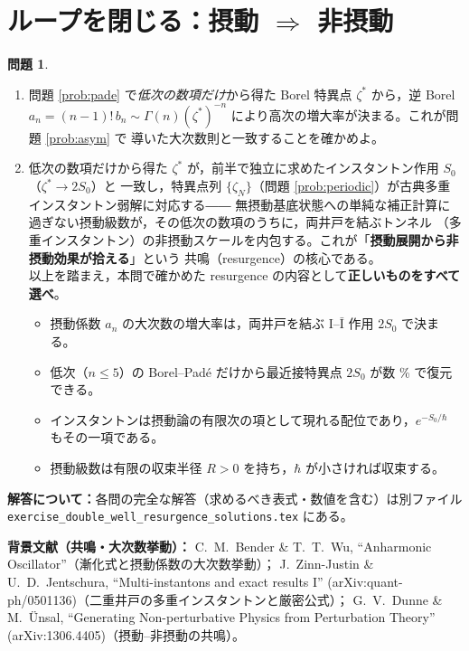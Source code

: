 \documentclass[dvipdfmx, uplatex]{jsarticle}
\newcommand{\hb}{\hbar}
\theoremstyle{definition}
\newtheorem{prob}{問題}
\begin{document}
\section{ループを閉じる：摂動 $\Rightarrow$ 非摂動}

\begin{prob}\label{prob:loop}
\begin{enumerate}
\item 問題 \ref{prob:pade} で\emph{低次の数項だけ}から得た Borel 特異点 $\zeta^\ast$ から，逆 Borel
$a_n=(n-1)!\,b_n\sim\Gamma(n)(\zeta^\ast)^{-n}$ により高次の増大率が決まる。これが問題 \ref{prob:asym} で
導いた大次数則と一致することを確かめよ。
\item 低次の数項だけから得た $\zeta^\ast$ が，前半で独立に求めたインスタントン作用 $S_0$（$\zeta^\ast\to2S_0$）と
一致し，特異点列 $\{\zeta_N\}$（問題 \ref{prob:periodic}）が古典多重インスタントン弱解に対応する――
無摂動基底状態への単純な補正計算に過ぎない摂動級数が，その低次の数項のうちに，両井戸を結ぶトンネル
（多重インスタントン）の非摂動スケールを内包する。これが「\textbf{摂動展開から非摂動効果が拾える}」という
共鳴（resurgence）の核心である。\\
以上を踏まえ，本問で確かめた resurgence の内容として\textbf{正しいものをすべて選べ}。
\begin{itemize}\setlength{\itemsep}{1pt}
\item[(あ)] 摂動係数 $a_n$ の大次数の増大率は，両井戸を結ぶ I--$\bar{\mathrm I}$ 作用 $2S_0$ で決まる。
\item[(い)] 低次（$n\le5$）の Borel--Pad\'e だけから最近接特異点 $2S_0$ が数 \% で復元できる。
\item[(う)] インスタントンは摂動論の有限次の項として現れる配位であり，$e^{-S_0/\hb}$ もその一項である。
\item[(え)] 摂動級数は有限の収束半径 $R>0$ を持ち，$\hb$ が小さければ収束する。
\end{itemize}
\end{enumerate}
\end{prob}

\bigskip
{\sloppy
\noindent\textbf{解答について：}各問の完全な解答（求めるべき表式・数値を含む）は別ファイル
\texttt{exercise\_double\_well\_resurgence\_solutions.tex} にある。
\par}

\medskip
\noindent\textbf{背景文献（共鳴・大次数挙動）：}
C.~M.~Bender \& T.~T.~Wu, ``Anharmonic Oscillator''（漸化式と摂動係数の大次数挙動）；
J.~Zinn-Justin \& U.~D.~Jentschura, ``Multi-instantons and exact results I''
(arXiv:quant-ph/0501136)（二重井戸の多重インスタントンと厳密公式）；
G.~V.~Dunne \& M.~\"Unsal, ``Generating Non-perturbative Physics from
Perturbation Theory'' (arXiv:1306.4405)（摂動--非摂動の共鳴）。
\end{document}
